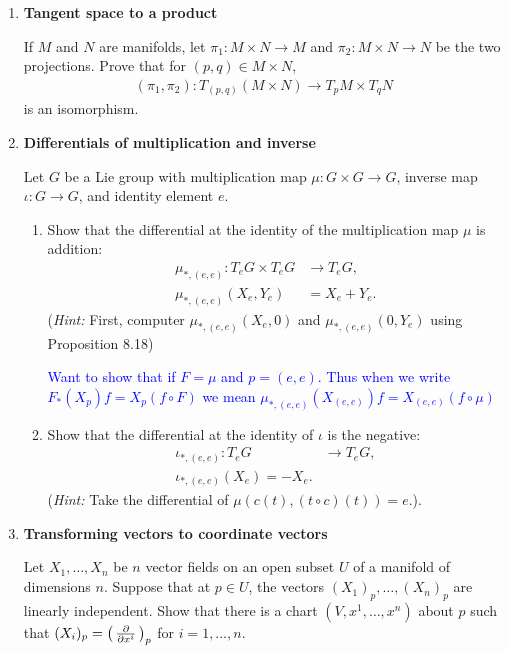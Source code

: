 \documentclass[12pt,a4paper]{report}
\newcommand{\BLUE}[1]{\textcolor{blue}{#1}}
\begin{document}
\begin{enumerate}[label=8.\arabic*.]
\item \textbf{Tangent space to a product}

If $M$ and $N$ are manifolds, let $\pi_1 : M \times N \to M$ and $\pi_2 : M \times N \to N$ be the two projections.  Prove that for $(p,q) \in M \times N$,
\begin{align*}
	(\pi_1, \pi_2) : T_{(p,q)}(M \times N)\to T_pM \times T_qN
\end{align*}is an isomorphism.

\item \textbf{Differentials of multiplication and inverse}

Let $G$ be a Lie group with multiplication map $\mu:G \times G \to G$, inverse map $\iota : G \to G$, and identity element $e$.
\begin{enumerate}[label=(\alph*)]

\item Show that the differential at the identity of the multiplication map $\mu$ is addition:
\begin{align*}
	\mu_{*,(e,e)} : T_eG \times T_e G &\to T_e G,\\
	\mu_{*,(e,e)}(X_e, Y_e) &= X_e + Y_e.
\end{align*}(\textit{Hint:}  First, computer $\mu_{*,(e,e)}(X_e, 0)$ and $\mu_{*,(e,e)}(0,Y_e)$ using Proposition 8.18)

\BLUE{Want to show that if $F=\mu$ and $p=(e,e)$.  Thus when we write $F_*(X_p)f = X_p(f\circ F)$ we mean $\mu_{*,(e,e)}(X_{(e,e)})f = X_{(e,e)}(f\circ \mu)$
}

\item Show that the differential at the identity of $\iota$ is the negative:
\begin{align*}
	\iota_{*,(e,e)}: T_e G &\to T_e G,\\
	\iota_{*,(e,e)}(X_e) = -X_e.
\end{align*}(\textit{Hint:} Take the differential of $\mu(c(t), (t\circ c)(t)) = e.$).

\end{enumerate}

\item \textbf{Transforming vectors to coordinate vectors}

Let $X_1, \dots, X_n$ be $n$ vector fields on an open subset $U$ of a manifold of dimensions $n$.  Suppose that at $p\in U$, the vectors $(X_1)_p, \dots, (X_n)_p$ are linearly independent.  Show that there is a chart $(V, x^1, \dots, x^n)$ about $p$ such that $(X_i)_p = \left (\, \frac{\partial }{\partial x^i} \,\right )_p$ for $i = 1, \dots, n$.


\end{enumerate}
\end{document}
